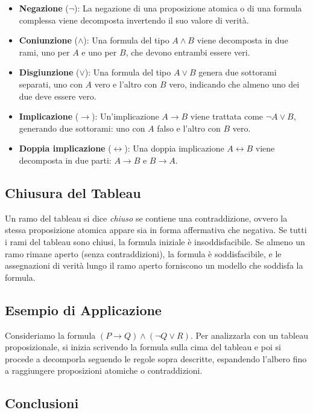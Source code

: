 \documentclass{article}
\begin{document}
\begin{itemize}
    \item \textbf{Negazione} ($\neg$): La negazione di una proposizione atomica o di una formula complessa viene decomposta invertendo il suo valore di verità.
    \item \textbf{Coniunzione} ($\land$): Una formula del tipo $A \land B$ viene decomposta in due rami, uno per $A$ e uno per $B$, che devono entrambi essere veri.
    \item \textbf{Disgiunzione} ($\lor$): Una formula del tipo $A \lor B$ genera due sottorami separati, uno con $A$ vero e l'altro con $B$ vero, indicando che almeno uno dei due deve essere vero.
    \item \textbf{Implicazione} ($\to$): Un'implicazione $A \to B$ viene trattata come $\neg A \lor B$, generando due sottorami: uno con $A$ falso e l'altro con $B$ vero.
    \item \textbf{Doppia implicazione} ($\leftrightarrow$): Una doppia implicazione $A \leftrightarrow B$ viene decomposta in due parti: $A \to B$ e $B \to A$.
\end{itemize}

\subsection{Chiusura del Tableau}

Un ramo del tableau si dice \textit{chiuso} se contiene una contraddizione, ovvero la stessa proposizione atomica appare sia in forma affermativa che negativa. Se tutti i rami del tableau sono chiusi, la formula iniziale è insoddisfacibile. Se almeno un ramo rimane aperto (senza contraddizioni), la formula è soddisfacibile, e le assegnazioni di verità lungo il ramo aperto forniscono un modello che soddisfa la formula.

\subsection{Esempio di Applicazione}

Consideriamo la formula $(P \to Q) \land (\neg Q \lor R)$. Per analizzarla con un tableau proposizionale, si inizia scrivendo la formula sulla cima del tableau e poi si procede a decomporla seguendo le regole sopra descritte, espandendo l'albero fino a raggiungere proposizioni atomiche o contraddizioni.

\subsection{Conclusioni}
\end{document}
